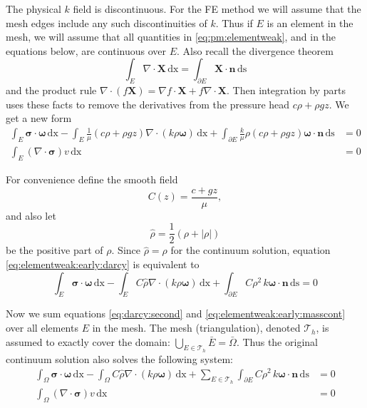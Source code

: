 \documentclass[11pt]{amsart}
\newcommand{\bn}{\mathbf{n}}
\newcommand{\bX}{\mathbf{X}}
\newcommand{\bsigma}{\bm{\sigma}}
\newcommand{\bomega}{\bm{\omega}}
\newcommand{\cT}{\mathcal{T}}
\newcommand{\dx}{\mathrm{dx}}
\newcommand{\ds}{\mathrm{ds}}
\newcommand{\Div}{\nabla\cdot}
\newcommand{\grad}{\nabla}
\begin{document}
The physical $k$ field is discontinuous.  For the FE method we will assume that the mesh edges include any such discontinuities of $k$.  Thus if $E$ is an element in the mesh, we will assume that all quantities in \eqref{eq:pm:elementweak}, and in the equations below, are continuous over $E$.  Also recall the divergence theorem
    $$\int_E \Div \bX\,\dx = \int_{\partial E} \bX\cdot \bn\,\ds$$
and the product rule $\Div(f\bX) = \grad f \cdot \bX + f \Div \bX$.  Then integration by parts uses these facts to remove the derivatives from the pressure head $c\rho+\rho g z$.  We get a new form
\begin{subequations}
\label{eq:elementweak:early}
\begin{align}
\int_E \bsigma\cdot \bomega\,\dx - \int_E \frac{1}{\mu} \left(c \rho + \rho g z\right) \Div(k\rho\bomega)\,\dx + \int_{\partial E} \frac{k}{\mu} \rho \left(c \rho + \rho g z\right) \bomega\cdot\bn\,\ds &= 0 \label{eq:elementweak:early:darcy} \\
\int_E (\Div \bsigma) v\,\dx &= 0 \label{eq:elementweak:early:masscont}
\end{align}
\end{subequations}

For convenience define the smooth field
\begin{equation}
C(z) = \frac{c + g z}{\mu},
\end{equation}
and also let
\begin{equation}
\hat\rho = \frac{1}{2}(\rho + |\rho|)  \label{eq:rhoplus}
\end{equation}
be the positive part of $\rho$.  Since $\hat\rho=\rho$ for the continuum solution, equation \eqref{eq:elementweak:early:darcy} is equivalent to
\begin{equation}
\int_E \bsigma\cdot \bomega\,\dx - \int_E C \hat\rho \Div(k\rho\bomega)\,\dx + \int_{\partial E} C \rho^2 \, k \bomega\cdot\bn\,\ds = 0 \label{eq:darcy:second}
\end{equation}

Now we sum equations \eqref{eq:darcy:second} and \eqref{eq:elementweak:early:masscont} over all elements $E$ in the mesh.  The mesh (triangulation), denoted $\cT_h$, is assumed to exactly cover the domain: $\bigcup_{E\in\cT_h} \bar E = \bar \Omega$.  Thus the original continuum solution also solves the following system:
\begin{subequations}
\label{eq:weak:early}
\begin{align}
\int_\Omega \bsigma\cdot \bomega\,\dx - \int_\Omega C \hat\rho \Div(k\rho\bomega)\,\dx + \sum_{E\in\cT_h} \int_{\partial E} C \rho^2 \, k \bomega\cdot\bn\,\ds &= 0 \label{eq:weak:early:darcy} \\
\int_\Omega (\Div \bsigma) v\,\dx &= 0 \label{eq:weak:early:masscont}
\end{align}
\end{subequations}
\end{document}
